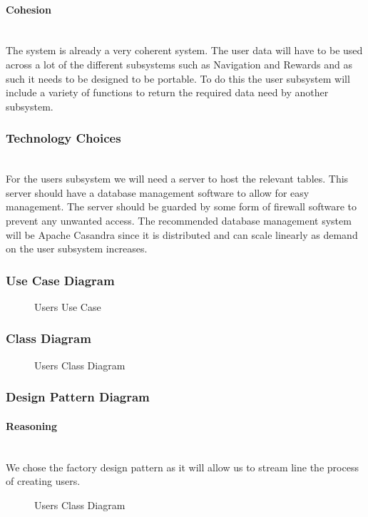 \paragraph{Cohesion}
\mbox{}\\
The system is already a very coherent system. The user data will have to be used across a lot of the different subsystems such as Navigation and Rewards and as such it needs to be designed to be portable. To do this the user subsystem will include a variety of functions to return the required data need by another subsystem. 

\subsubsection{Technology Choices}
\mbox{}\\
For the users subsystem we will need a server to host the relevant tables. This server should have a database management software to allow for easy management. The server should be 
guarded by some form of firewall software to prevent any unwanted access. The recommended database management system will be Apache Casandra since it is distributed and can scale linearly as demand on the user subsystem increases.

\clearpage
\subsubsection{Use Case Diagram}
	\begin{figure}[h!]
	\caption{Users Use Case}
	\end{figure}
\clearpage	
\subsubsection{Class Diagram}
	\begin{figure}[h!]
	\caption{Users Class Diagram}
	\end{figure}
\clearpage
\subsubsection{Design Pattern Diagram}
	\paragraph{Reasoning}
	\mbox{}\\
	We chose the factory design pattern as it will allow us to stream line the process of creating users. 
	\begin{figure}[h!]
	\caption{Users Class Diagram}
	\end{figure}
